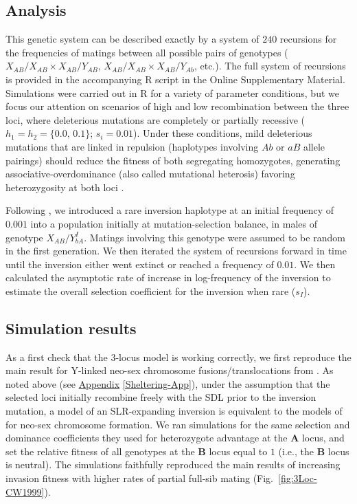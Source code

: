 \documentclass{article}
\def\mbf#1{\mathbf{#1}}
\begin{document}
\begin{appendices}
\subsection{Analysis}

This genetic system can be described exactly by a system of $240$ recursions for the frequencies of matings between all possible pairs of genotypes ($X_{AB}/X_{AB} \times X_{AB}/Y_{AB}$, $X_{AB}/X_{AB} \times X_{AB}/Y_{Ab}$, etc.). The full system of recursions is provided in the accompanying R script in the Online Supplementary Material. Simulations were carried out in R \citep{RSoftware} for a variety of parameter conditions, but we focus our attention on scenarios of high and low recombination between the three loci, where deleterious mutations are completely or partially recessive ($h_1 = h_2 = \{0.0,\, 0.1\}$; $s_i = 0.01$). Under these conditions, mild deleterious mutations that are linked in repulsion (haplotypes involving $Ab$ or $aB$ allele pairings) should reduce the fitness of both segregating homozygotes, generating associative-overdominance (also called mutational heterosis) favoring heterozygosity at both loci \citep{Ohta1971a, Waller2021}.

Following \citet{CharlesworthWall1999}, we introduced a rare inversion haplotype at an initial frequency of $0.001$ into a population initially at mutation-selection balance, in males of genotype $X_{AB}/Y_{bA}^I$. Matings involving this genotype were assumed to be random in the first generation. We then iterated the system of recursions forward in time until the inversion either went extinct or reached a frequency of $0.01$. We then calculated the asymptotic rate of increase in log-frequency of the inversion to estimate the overall selection coefficient for the inversion when rare ($s_I$). 

\subsection{Simulation results}

As a first check that the 3-locus model is working correctly, we first reproduce the main result for Y-linked neo-sex chromosome fusions/translocations from \citet{CharlesworthWall1999}. As noted above (see \hyperref[Sheltering-App]{Appendix} \ref{Sheltering-App}), under the assumption that the selected loci initially recombine freely with the SDL prior to the inversion mutation, a model of an SLR-expanding inversion is equivalent to the models of \citet{CharlesworthWall1999} for neo-sex chromosome formation. We ran simulations for the same selection and dominance coefficients they used for heterozygote advantage at the $\mbf{A}$ locus, and set the relative fitness of all genotypes at the $\mbf{B}$ locus equal to $1$ (i.e., the $\mbf{B}$ locus is neutral). The simulations faithfully reproduced the main results of increasing invasion fitness with higher rates of partial full-sib mating (Fig.~\ref{fig:3Loc-CW1999}).


\end{appendices}
\end{document}
